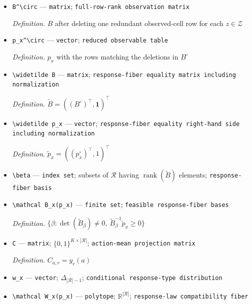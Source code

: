 \documentclass{article}
\begin{document}
\begin{itemize}
  \item \texttt{B\textasciicircum{}\textbackslash{}\allowbreak{}circ} --- \texttt{matrix}; \texttt{full-\allowbreak{}row-\allowbreak{}rank observation matrix}
  \par\smallskip\noindent\emph{Definition.} \(B\) after deleting one redundant observed-cell row for each \(z\in\mathcal Z\)
  \item \texttt{p\_\allowbreak{}x\textasciicircum{}\textbackslash{}\allowbreak{}circ} --- \texttt{vector}; \texttt{reduced observable table}
  \par\smallskip\noindent\emph{Definition.} \(p_x\) with the rows matching the deletions in \(B^\circ\)
  \item \texttt{\textbackslash{}\allowbreak{}widetilde B} --- \texttt{matrix}; \texttt{response-\allowbreak{}fiber equality matrix including normalization}
  \par\smallskip\noindent\emph{Definition.} \(\widetilde B=((B^\circ)^\top,\mathbf 1)^\top\)
  \item \texttt{\textbackslash{}\allowbreak{}widetilde p\_\allowbreak{}x} --- \texttt{vector}; \texttt{response-\allowbreak{}fiber equality right-\allowbreak{}hand side including normalization}
  \par\smallskip\noindent\emph{Definition.} \(\widetilde p_x=((p_x^\circ)^\top,1)^\top\)
  \item \texttt{\textbackslash{}\allowbreak{}beta} --- \texttt{index set}; subsets of \(\mathcal R\) having \(\operatorname{rank}(\widetilde B)\) elements; \texttt{response-\allowbreak{}fiber basis}
  \item \texttt{\textbackslash{}\allowbreak{}mathcal B\_\allowbreak{}x(p\_\allowbreak{}x)} --- \texttt{finite set}; \texttt{feasible response-\allowbreak{}fiber bases}
  \par\smallskip\noindent\emph{Definition.} \(\{\beta:\det(\widetilde B_\beta)\neq0,\ \widetilde B_\beta^{-1}\widetilde p_x\geq0\}\)
  \item \texttt{C} --- \texttt{matrix}; \(\{0,1\}^{K\times|\mathcal R|}\); \texttt{action-\allowbreak{}mean projection matrix}
  \par\smallskip\noindent\emph{Definition.} \(C_{a,r}=y_r(a)\)
  \item \texttt{w\_\allowbreak{}x} --- \texttt{vector}; \(\Delta_{|\mathcal R|-1}\); \texttt{conditional response-\allowbreak{}type distribution}
  \item \texttt{\textbackslash{}\allowbreak{}mathcal W\_\allowbreak{}x(p\_\allowbreak{}x)} --- \texttt{polytope}; \(\mathbb R^{|\mathcal R|}\); \texttt{response-\allowbreak{}law compatibility fiber}

\end{itemize}
\end{document}
